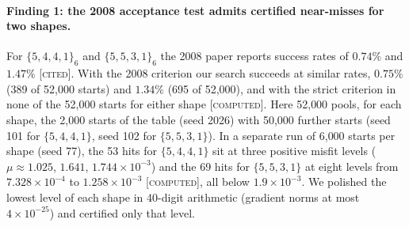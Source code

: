 \documentclass[11pt]{article}
\newcommand{\st}[1]{\textsc{[#1]}}
\newcommand{\stcomp}{\st{computed}}
\newcommand{\stcited}{\st{cited}}
\theoremstyle{definition}
\theoremstyle{remark}
\begin{document}
\paragraph{Finding 1: the 2008 acceptance test admits certified near-misses for two shapes.} For $\{5,4,4,1\}_6$ and $\{5,5,3,1\}_6$ the 2008 paper
reports success rates of $0.74\%$ and $1.47\%$ \cite{BW08} \stcited. With the 2008 criterion our search succeeds at
similar rates, $0.75\%$ (389 of 52{,}000 starts) and $1.34\%$ (695 of 52{,}000), and with the strict criterion in none of the
52{,}000 starts for either shape \stcomp. Here 52{,}000 pools, for each shape, the 2{,}000 starts of the table (seed 2026)
with 50{,}000 further starts (seed 101 for $\{5,4,4,1\}$, seed 102 for $\{5,5,3,1\}$). In a separate run of 6{,}000 starts
per shape (seed 77), the 53 hits for $\{5,4,4,1\}$ sit at three positive misfit levels ($\mu\approx1.025$, $1.641$,
$1.744\times10^{-3}$) and the 69 hits for $\{5,5,3,1\}$ at eight levels from $7.328\times10^{-4}$ to $1.258\times10^{-3}$
\stcomp, all below $1.9\times10^{-3}$. We polished the lowest level of each shape in 40-digit arithmetic (gradient norms
at most $4\times10^{-25}$) and certified only that level.
\end{document}
